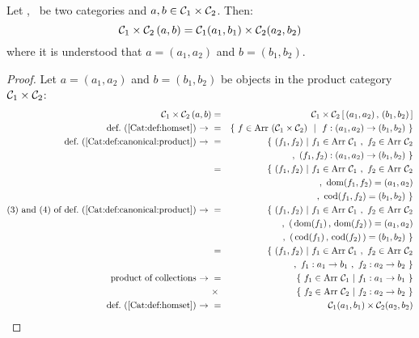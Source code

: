 \begin{prop}\label{Cat:prop:homset:product}
    Let \Cone, \Ctwo\ be two categories and $a,b\in\mbox{${\cal C}_{1}$}\times\mbox{${\cal C}_{2}$}$. Then:
        \[
            \mbox{${\cal C}_{1}$}\times\mbox{${\cal C}_{2}$}\,(a,b) 
            = 
            \mbox{${\cal C}_{1}$}(a_{1},b_{1})\times\mbox{${\cal C}_{2}$}(a_{2},b_{2})
        \]
    where it is understood that $a=(a_{1},a_{2})$ and $b=(b_{1},b_{2})$.
\end{prop}
\begin{proof}
    Let $a=(a_{1},a_{2})$ and $b=(b_{1},b_{2})$ be objects in the
    product category $\mbox{${\cal C}_{1}$}\times\mbox{${\cal C}_{2}$}$:
    \begin{eqnarray*}\Cone\times\Ctwo\,(a,b) 
        &=&\Cone\times\Ctwo\,[\,(a_{1},a_{2})\,,\,(b_{1},b_{2})\,]\\
        \mbox{def.~(\ref{Cat:def:homset})\ $\to$\ }
        &=&\{\ f\in\arr\ (\Cone\times\Ctwo)\ \ |\ \ 
               f : (a_{1},a_{2})\to(b_{1},b_{2})\ \}\\
        \mbox{def.~(\ref{Cat:def:canonical:product})\ $\to$\ }
        &=&\{\ (f_{1},f_{2})\ |\ f_{1}\in\arr\ \Cone\ ,\ f_{2}\in\arr\ \Ctwo\\
        &\ &\,,\ (f_{1},f_{2}) : (a_{1},a_{2})\to(b_{1},b_{2})\ \}\\
        &=&\{\ (f_{1},f_{2})\ |\ f_{1}\in\arr\ \Cone\ ,\ f_{2}\in\arr\ \Ctwo\\
        &\ &\,,\ \dom(f_{1},f_{2})=(a_{1},a_{2})\\
        &\ &\,,\ \cod(f_{1},f_{2})=(b_{1},b_{2})\ \}\\
        \mbox{$(3)$ and $(4)$ of def.~(\ref{Cat:def:canonical:product})\ $\to$\ }
        &=&\{\ (f_{1},f_{2})\ |\ f_{1}\in\arr\ \Cone\ ,\ f_{2}\in\arr\ \Ctwo\\
        &\ &\,,\ (\,\dom(f_{1})\,,\,\dom(f_{2})\,)=(a_{1},a_{2})\\
        &\ &\,,\ (\,\cod(f_{1})\,,\,\cod(f_{2})\,)=(b_{1},b_{2})\ \}\\
        &=&\{\ (f_{1},f_{2})\ |\ f_{1}\in\arr\ \Cone\ ,\ f_{2}\in\arr\ \Ctwo\\
        &\ &\,,\ f_{1}:a_{1}\to b_{1}\ ,\ f_{2}:a_{2}\to b_{2}\ \}\\
        \mbox{product of collections\ $\to$\ }
        &=&\{\ f_{1}\in\arr\ \Cone\ |\ f_{1}:a_{1}\to b_{1}\ \}\\
        &\times& \{\ f_{2}\in\arr\ \Ctwo\ |\ f_{2}:a_{2}\to b_{2}\ \}\\
        \mbox{def.~(\ref{Cat:def:homset})\ $\to$\ }
        &=&\Cone(a_{1},b_{1})\times\Ctwo(a_{2},b_{2})
    \end{eqnarray*}
\end{proof}


